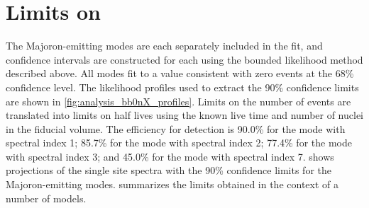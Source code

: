 \documentclass[herrin-thesis.tex]{subfiles}
\begin{document}
\section{Limits on \texorpdfstring{\zeronuXpX{}}{Majoron-emitting double beta decays}}
The Majoron-emitting modes are each separately included in the fit, and confidence intervals are constructed for each using the bounded likelihood method described above. All modes fit to a value consistent with zero events at the 68\% confidence level. The likelihood profiles used to extract the 90\% confidence limits are shown in \cref{fig:analysis_bb0nX_profiles}. Limits on the number of events are translated into limits on half lives using the known live time and number of  nuclei in the fiducial volume. The efficiency for detection is 90.0\% for the mode with spectral index 1; 85.7\% for the mode with spectral index 2; 77.4\% for the mode with spectral index 3; and 45.0\% for the mode with spectral index 7.  shows projections of the single site spectra with the 90\% confidence limits for the Majoron-emitting modes.  summarizes the limits obtained in the context of a number of models.
\end{document}
